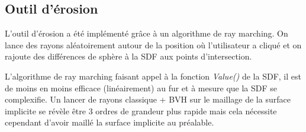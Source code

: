 \subsection {Outil d'érosion}

L'outil d'érosion a été implémenté grâce à un algorithme de ray marching. On lance des rayons aléatoirement autour de la position où l'utilisateur a cliqué
et on rajoute des différences de sphère à la SDF aux points d'intersection. 

L'algorithme de ray marching faisant appel à la fonction \textit{Value()} de la SDF, il est de moins
en moins efficace (linéairement) au fur et à mesure que la SDF se complexifie. Un lancer de rayons classique + BVH sur le maillage de la surface implicite se révèle être 3 
ordres de grandeur plus rapide mais cela nécessite cependant d'avoir maillé la surface implicite au préalable.

